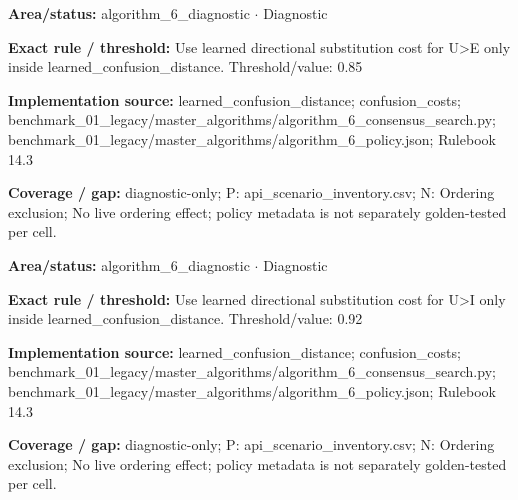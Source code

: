 \begin{tcolorbox}[enhanced,breakable,colback=white,colframe=Muted!45,boxrule=0.45pt,arc=1.5pt,left=6pt,right=6pt,top=5pt,bottom=5pt,title={\texttt{A6-LEARNED-SUBSTITUTION-U-E}},title after break={\texttt{A6-LEARNED-SUBSTITUTION-U-E}\ (continued)},fonttitle=\headingfont\bfseries\color{Navy},coltitle=Navy]
\textbf{Area/status:} algorithm\_\allowbreak{}6\_\allowbreak{}diagnostic $\boldsymbol{\cdot}$ Diagnostic\par
\smallskip
\textbf{Exact rule / threshold:} Use learned directional substitution cost for U>E only inside learned\_\allowbreak{}confusion\_\allowbreak{}distance. Threshold/\allowbreak{}value: 0.85\par
\smallskip
\textbf{Implementation source:} learned\_\allowbreak{}confusion\_\allowbreak{}distance; confusion\_\allowbreak{}costs; benchmark\_\allowbreak{}01\_\allowbreak{}legacy/\allowbreak{}master\_\allowbreak{}algorithms/\allowbreak{}algorithm\_\allowbreak{}6\_\allowbreak{}consensus\_\allowbreak{}search.py; benchmark\_\allowbreak{}01\_\allowbreak{}legacy/\allowbreak{}master\_\allowbreak{}algorithms/\allowbreak{}algorithm\_\allowbreak{}6\_\allowbreak{}policy.json; Rulebook 14.3\par
\smallskip
\textbf{Coverage / gap:} diagnostic-only; P: api\_\allowbreak{}scenario\_\allowbreak{}inventory.csv; N: Ordering exclusion; No live ordering effect; policy metadata is not separately golden-tested per cell.
\end{tcolorbox}
\begin{tcolorbox}[enhanced,breakable,colback=white,colframe=Muted!45,boxrule=0.45pt,arc=1.5pt,left=6pt,right=6pt,top=5pt,bottom=5pt,title={\texttt{A6-LEARNED-SUBSTITUTION-U-I}},title after break={\texttt{A6-LEARNED-SUBSTITUTION-U-I}\ (continued)},fonttitle=\headingfont\bfseries\color{Navy},coltitle=Navy]
\textbf{Area/status:} algorithm\_\allowbreak{}6\_\allowbreak{}diagnostic $\boldsymbol{\cdot}$ Diagnostic\par
\smallskip
\textbf{Exact rule / threshold:} Use learned directional substitution cost for U>I only inside learned\_\allowbreak{}confusion\_\allowbreak{}distance. Threshold/\allowbreak{}value: 0.92\par
\smallskip
\textbf{Implementation source:} learned\_\allowbreak{}confusion\_\allowbreak{}distance; confusion\_\allowbreak{}costs; benchmark\_\allowbreak{}01\_\allowbreak{}legacy/\allowbreak{}master\_\allowbreak{}algorithms/\allowbreak{}algorithm\_\allowbreak{}6\_\allowbreak{}consensus\_\allowbreak{}search.py; benchmark\_\allowbreak{}01\_\allowbreak{}legacy/\allowbreak{}master\_\allowbreak{}algorithms/\allowbreak{}algorithm\_\allowbreak{}6\_\allowbreak{}policy.json; Rulebook 14.3\par
\smallskip
\textbf{Coverage / gap:} diagnostic-only; P: api\_\allowbreak{}scenario\_\allowbreak{}inventory.csv; N: Ordering exclusion; No live ordering effect; policy metadata is not separately golden-tested per cell.
\end{tcolorbox}
